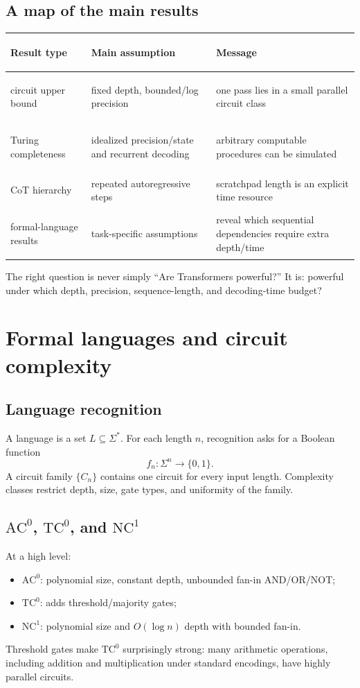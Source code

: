 \documentclass[11pt,a4paper,oneside,openany]{memoir}
\theoremstyle{definition}
\begin{document}
\section{A map of the main results}
\begin{center}\small
\begin{tabularx}{\textwidth}{>{\bfseries\raggedright\arraybackslash}p{}XX}
\toprule
Result type & Main assumption & Message\\
\midrule
circuit upper bound & fixed depth, bounded/log precision & one pass lies in a small parallel circuit class\\
Turing completeness & idealized precision/state and recurrent decoding & arbitrary computable procedures can be simulated\\
CoT hierarchy & repeated autoregressive steps & scratchpad length is an explicit time resource\\
formal-language results & task-specific assumptions & reveal which sequential dependencies require extra depth/time\\
\bottomrule
\end{tabularx}
\end{center}

\begin{presentbox}
The right question is never simply ``Are Transformers powerful?''  It is: powerful under which depth, precision, sequence-length, and decoding-time budget?
\end{presentbox}

\chapter{Formal languages and circuit complexity}
\section{Language recognition}
A language is a set $L\subseteq\Sigma^*$.  For each length $n$, recognition asks for a Boolean function
\[
f_n:\Sigma^n\to\{0,1\}.
\]
A circuit family $\{C_n\}$ contains one circuit for every input length.  Complexity classes restrict depth, size, gate types, and uniformity of the family.

\section{$\mathrm{AC}^0$, $\mathrm{TC}^0$, and $\mathrm{NC}^1$}
At a high level:
\begin{itemize}
\item $\mathrm{AC}^0$: polynomial size, constant depth, unbounded fan-in AND/OR/NOT;
\item $\mathrm{TC}^0$: adds threshold/majority gates;
\item $\mathrm{NC}^1$: polynomial size and $O(\log n)$ depth with bounded fan-in.
\end{itemize}
Threshold gates make $\mathrm{TC}^0$ surprisingly strong: many arithmetic operations, including addition and multiplication under standard encodings, have highly parallel circuits.
\end{document}
